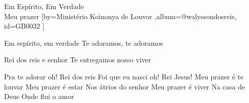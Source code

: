 \beginsong
{Em Espírito, Em Verdade\\Meu prazer %
}[by={Ministério Koinonya de Louvor %
},album={@walyssondosreis},
id={GB0032 %
}] 

\beginverse*
Em espírito, em verdade
Te adoramos, te adoramos

\endverse

\beginverse*
Rei dos reis e senhor
Te entregamos nosso viver
\endverse

\beginchorus 
Pra te adorar oh! Rei dos reis
Foi que eu nasci oh! Rei Jesus!
Meu prazer é te louvar
Meu prazer é estar
Nos átrios do senhor
Meu prazer é viver
Na casa de Deus
Onde flui o amor
\endchorus

\begin{comment}
\lstset{basicstyle=\scriptsize\bf} %
\tab{Solo 1}
\begin{lstlisting}
E|-----------------------------------------------------|
B|-----------------------------------------------------|
G|-----------------------------------------------------|
D|-----------------------------------------------------|
A|-----------------------------------------------------|
E|-----------------------------------------------------|
\end{lstlisting}
\end{comment}
\vspace{2em}
%
%
% 
% 
\endsong
\begin{comment}

\end{comment}